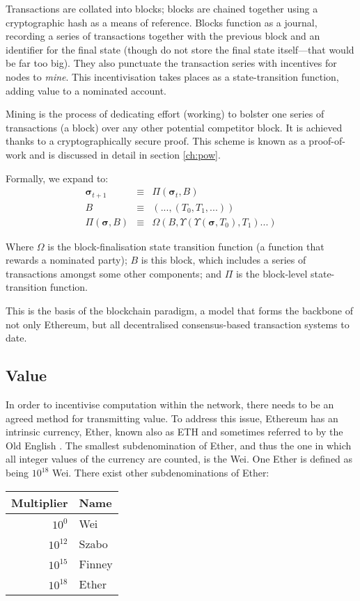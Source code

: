 \documentclass[9pt,oneside]{amsart}
\begin{document}
\begin{multicols}{2}
Transactions are collated into blocks; blocks are chained together using a cryptographic hash as a means of reference. Blocks function as a journal, recording a series of transactions together with the previous block and an identifier for the final state (though do not store the final state itself---that would be far too big). They also punctuate the transaction series with incentives for nodes to \textit{mine}. This incentivisation takes places as a state-transition function, adding value to a nominated account.

Mining is the process of dedicating effort (working) to bolster one series of transactions (a block) over any other potential competitor block. It is achieved thanks to a cryptographically secure proof. This scheme is known as a proof-of-work and is discussed in detail in section \ref{ch:pow}.

Formally, we expand to:
\begin{eqnarray}
\boldsymbol{\sigma}_{t+1} & \equiv & \Pi(\boldsymbol{\sigma}_t, B) \\
B & \equiv & (..., (T_0, T_1, ...) ) \\
\Pi(\boldsymbol{\sigma}, B) & \equiv & \Omega(B, \Upsilon(\Upsilon(\boldsymbol{\sigma}, T_0), T_1) ...)
\end{eqnarray}

Where $\Omega$ is the block-finalisation state transition function (a function that rewards a nominated party); $B$ is this block, which includes a series of transactions amongst some other components; and $\Pi$ is the block-level state-transition function.

This is the basis of the blockchain paradigm, a model that forms the backbone of not only Ethereum, but all decentralised consensus-based transaction systems to date.

\subsection{Value}

In order to incentivise computation within the network, there needs to be an agreed method for transmitting value. To address this issue, Ethereum has an intrinsic currency, Ether, known also as {\small ETH} and sometimes referred to by the Old English \DH{}. The smallest subdenomination of Ether, and thus the one in which all integer values of the currency are counted, is the Wei. One Ether is defined as being $10^{18}$ Wei. There exist other subdenominations of Ether:
\par
\begin{center}
\begin{tabular}{rl}
\toprule
Multiplier & Name \\
\midrule
$10^0$ & Wei \\
$10^{12}$ & Szabo \\
$10^{15}$ & Finney \\
$10^{18}$ & Ether \\
\bottomrule
\end{tabular}
\end{center}
\par


\end{multicols}
\end{document}
